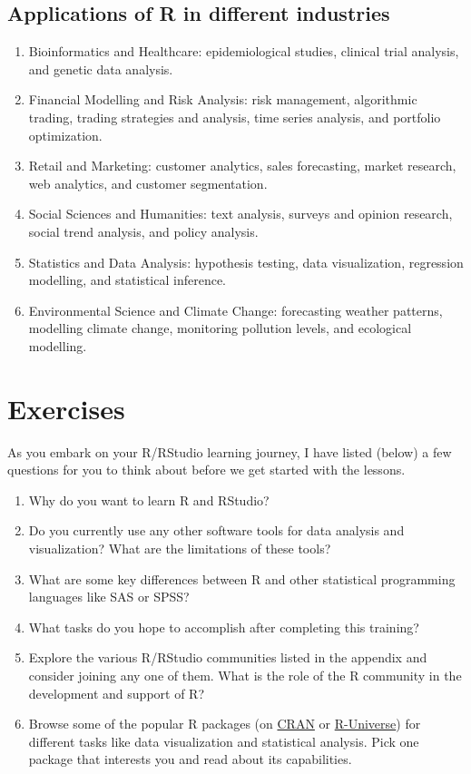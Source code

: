 \documentclass[
  letterpaper,
  DIV=11,
  numbers=noendperiod]{scrreprt}
\begin{document}
\subsection{Applications of R in different
industries}\label{applications-of-r-in-different-industries}

\begin{enumerate}
\def\labelenumi{\roman{enumi}.}
\item
  Bioinformatics and Healthcare: epidemiological studies, clinical trial
  analysis, and genetic data analysis.
\item
  Financial Modelling and Risk Analysis: risk management, algorithmic
  trading, trading strategies and analysis, time series analysis, and
  portfolio optimization.
\item
  Retail and Marketing: customer analytics, sales forecasting, market
  research, web analytics, and customer segmentation.
\item
  Social Sciences and Humanities: text analysis, surveys and opinion
  research, social trend analysis, and policy analysis.
\item
  Statistics and Data Analysis: hypothesis testing, data visualization,
  regression modelling, and statistical inference.
\item
  Environmental Science and Climate Change: forecasting weather
  patterns, modelling climate change, monitoring pollution levels, and
  ecological modelling.
\end{enumerate}

\section{Exercises}\label{exercises}

As you embark on your R/RStudio learning journey, I have listed (below)
a few questions for you to think about before we get started with the
lessons.

\begin{enumerate}
\def\labelenumi{\roman{enumi}.}
\item
  Why do you want to learn R and RStudio?
\item
  Do you currently use any other software tools for data analysis and
  visualization? What are the limitations of these tools?
\item
  What are some key differences between R and other statistical
  programming languages like SAS or SPSS?
\item
  What tasks do you hope to accomplish after completing this training?
\item
  Explore the various R/RStudio communities listed in the appendix and
  consider joining any one of them. What is the role of the R community
  in the development and support of R?
\item
  Browse some of the popular R packages (on
  \href{https://cran.r-project.org/}{CRAN} or
  \href{https://r-universe.dev/search/}{R-Universe}) for different tasks
  like data visualization and statistical analysis. Pick one package
  that interests you and read about its capabilities.
\end{enumerate}
\end{document}
